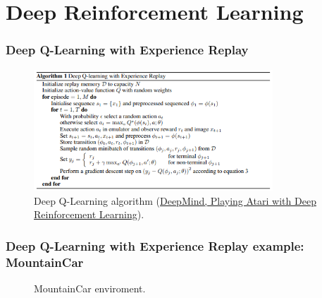 \documentclass{beamer}
\begin{document}
    \section{Deep Reinforcement Learning}

        \begin{frame}
            \frametitle{Deep Q-Learning with Experience Replay}
            \begin{figure}
                \centering
                \includegraphics[width=0.8\textwidth]{figures/deep_q_learning}
                \caption{Deep Q-Learning algorithm (\href{https://arxiv.org/pdf/1312.5602v1.pdf}{DeepMind, Playing Atari with Deep Reinforcement Learning}).}
                \label{fig9:deep-q}
            \end{figure}
        \end{frame}

        \begin{frame}
            \frametitle{Deep Q-Learning with Experience Replay example: MountainCar}
        
            \begin{figure}
                \centering
                \label{fig10:mountain2}
                \caption{MountainCar enviroment.}
            \end{figure}
        
        \end{frame}
\end{document}

